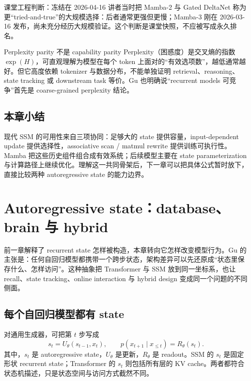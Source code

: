 \documentclass[a4paper]{article}
\begin{document}
\begin{knowledgebox}{课堂工程判断：冻结在 2026-04-16}
讲者当时把 Mamba-2 与 Gated DeltaNet 称为更“tried-and-true”的大规模选择：后者通常更强但更慢；Mamba-3 刚在 2026-03-16 发布，尚未充分经历大规模验证。这个判断是课堂快照，不应被写成永久排名。
\end{knowledgebox}

\begin{warningbox}{Perplexity parity 不是 capability parity}
Perplexity（困惑度）是交叉熵的指数 $\exp(H)$，可直观理解为模型在每个 token 上面对的“有效选项数”，越低通常越好。但它高度依赖 tokenizer 与数据分布，不能单独证明 retrieval、reasoning、state tracking 或 downstream task 等价。Gu 也明确说“recurrent models 可竞争”首先是 coarse-grained perplexity 结论。
\end{warningbox}

\subsection{本章小结}

现代 SSM 的可用性来自三项协同：足够大的 state 提供容量，input-dependent update 提供选择性，associative scan / matmul rewrite 提供训练可执行性。Mamba 把这些历史组件组合成有效系统；后续模型主要在 state parameterization 与计算路径上继续优化。理解这一共同骨架后，下一章可以把具体公式暂时放下，直接比较两种 autoregressive state 的能力边界。

\section{Autoregressive state：database、brain 与 hybrid}

前一章解释了 recurrent state 怎样被构造，本章转向它怎样改变模型行为。Gu 的主张是：任何自回归模型都携带一个跨步状态，架构差异可以先还原成“状态里保存什么、怎样访问”。这种抽象把 Transformer 与 SSM 放到同一坐标系，也让 recall、state tracking、online interaction 与 hybrid design 变成同一个问题的不同侧面。

\subsection{每个自回归模型都有 state}

对通用生成器，可把第 $t$ 步写成
\[
s_t=U_\theta(s_{t-1},x_t),
\qquad
p(x_{t+1}\mid x_{\le t})=R_\theta(s_t).
\]
其中，$s_t$ 是 autoregressive state，$U_\theta$ 是更新，$R_\theta$ 是 readout。SSM 的 $s_t$ 是固定形状 recurrent state；Transformer 的 $s_t$ 则包括所有层的 KV cache。两者都符合状态机描述，只是状态空间与访问方式截然不同。
\end{document}
